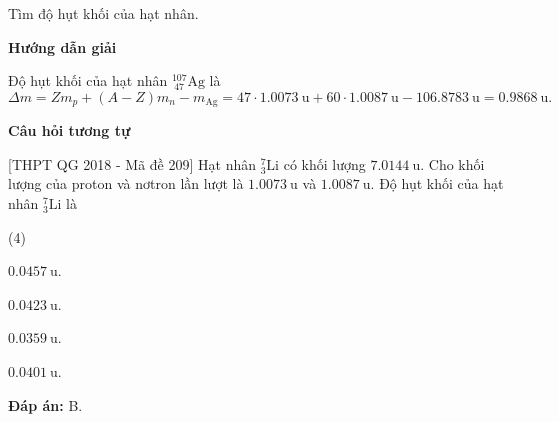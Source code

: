 \begin{dang}{Tìm độ hụt khối của hạt nhân.}
	
	
	{\begin{center}
			\textbf{Hướng dẫn giải}
		\end{center}
		
		Độ hụt khối của hạt nhân $^{107}_{\ 47}\text{Ag}$ là 
		\begin{equation*}
			\Delta m = Z m_p+ (A-Z) m_n - m_\text{Ag} = 47\cdot \SI{1,0073}{\atomicmassunit} + 60 \cdot \SI{1,0087}{\atomicmassunit} - \SI{106,8783}{\atomicmassunit} = \SI{0,9868}{\atomicmassunit}.
		\end{equation*}
		
		\begin{center}
			\textbf{Câu hỏi tương tự}
		\end{center}
		
		[THPT QG 2018 - Mã đề 209] Hạt nhân $^7_3\text{Li}$ có khối lượng $\SI{7,0144}{\atomicmassunit}$. Cho khối lượng của proton và nơtron lần lượt là $\SI{1,0073}{\atomicmassunit}$ và $\SI{1,0087}{\atomicmassunit}$. Độ hụt khối của hạt nhân $^7_3\text{Li}$ là
		\begin{mcq}(4)
			\item $\SI{0,0457}{\atomicmassunit}$.
			\item $\SI{0,0423}{\atomicmassunit}$.
			\item $\SI{0,0359}{\atomicmassunit}$.
			\item $\SI{0,0401}{\atomicmassunit}$.
		\end{mcq}
		
		\textbf{Đáp án:} B.}
	

\end{dang}
